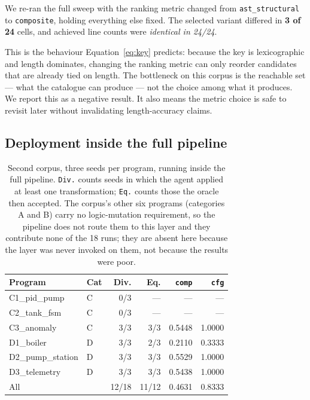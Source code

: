 \documentclass[10pt,twocolumn]{article}
\newcommand{\code}[1]{\texttt{\small #1}}
\begin{document}
We re-ran the full sweep with the ranking metric changed from
\code{ast\_structural} to \code{composite}, holding everything else fixed. The
selected variant differed in \textbf{3 of 24} cells, and achieved line counts
were \emph{identical in 24/24}.

This is the behaviour Equation~\ref{eq:key} predicts: because the key is
lexicographic and length dominates, changing the ranking metric can only reorder
candidates that are already tied on length. The bottleneck on this corpus is the
reachable set --- what the catalogue can produce --- not the choice among
what it produces. We report this as a negative result. It also means the metric
choice is safe to revisit later without invalidating length-accuracy claims.

\subsection{Deployment inside the full pipeline}
\label{sec:deploy}

\begin{table}[t]
\centering
\caption{Second corpus, three seeds per program, running inside the full
pipeline. \code{Div.} counts seeds in which the agent applied at least one
transformation; \code{Eq.} counts those the oracle then accepted. The corpus's
other six programs (categories A and B) carry no logic-mutation requirement, so
the pipeline does not route them to this layer and they contribute none of the
18 runs; they are absent here because the layer was never invoked on them, not
because the results were poor.}
\label{tab:deploy}
\small
\setlength{\tabcolsep}{4pt}
\begin{tabular}{llrrrr}
\toprule
Program & Cat & Div. & Eq. & \code{comp} & \code{cfg} \\
\midrule
C1\_pid\_pump      & C & 0/3 & --- & ---    & ---    \\
C2\_tank\_fsm      & C & 0/3 & --- & ---    & ---    \\
C3\_anomaly        & C & 3/3 & 3/3 & 0.5448 & 1.0000 \\
D1\_boiler         & D & 3/3 & 2/3 & 0.2110 & 0.3333 \\
D2\_pump\_station  & D & 3/3 & 3/3 & 0.5529 & 1.0000 \\
D3\_telemetry      & D & 3/3 & 3/3 & 0.5438 & 1.0000 \\
\midrule
All                & & 12/18 & 11/12 & 0.4631 & 0.8333 \\
\bottomrule
\end{tabular}
\end{table}
\end{document}
